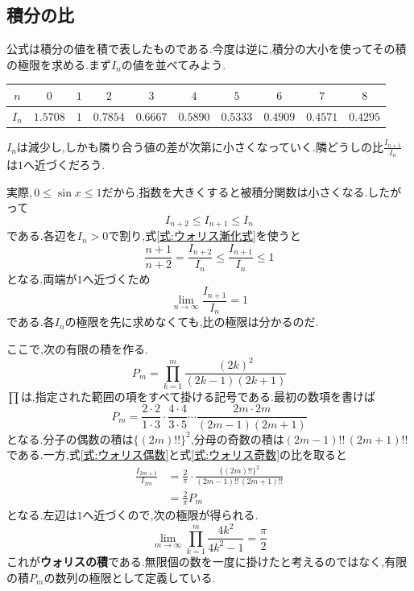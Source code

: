 \subsection{積分の比}

公式は積分の値を積で表したものである.今度は逆に,積分の大小を使ってその積の極限を求める.まず$I_n$の値を並べてみよう.
\begin{center}
\begin{tabular}{cccccccccc}
\toprule
$n$ & $0$ & $1$ & $2$ & $3$ & $4$ & $5$ & $6$ & $7$ & $8$\\
\midrule
$I_n$ & $1.5708$ & $1$ & $0.7854$ & $0.6667$ & $0.5890$ & $0.5333$ & $0.4909$ & $0.4571$ & $0.4295$\\
\bottomrule
\end{tabular}
\end{center}
$I_n$は減少し,しかも隣り合う値の差が次第に小さくなっていく.隣どうしの比$\frac{I_{n+1}}{I_n}$は$1$へ近づくだろう.

実際,\,$0\le\sin x\le1$だから,指数を大きくすると被積分関数は小さくなる.したがって
\[
 I_{n+2}\le I_{n+1}\le I_n
\]
である.各辺を$I_n>0$で割り,式\eqref{式:ウォリス漸化式}を使うと
\[
 \frac{n+1}{n+2}
 =\frac{I_{n+2}}{I_n}
 \le\frac{I_{n+1}}{I_n}\le1
\]
となる.両端が$1$へ近づくため
\begin{equation}\label{式:ウォリス隣接比}
 \lim_{n\to\infty}\frac{I_{n+1}}{I_n}=1
\end{equation}
である.各$I_n$の極限を先に求めなくても,比の極限は分かるのだ.

ここで,次の有限の積を作る.
\[
 P_m=\prod_{k=1}^{m}\frac{(2k)^2}{(2k-1)(2k+1)}
\]
$\prod$は,指定された範囲の項をすべて掛ける記号である.最初の数項を書けば
\[
 P_m=\frac{2\cdot2}{1\cdot3}\cdot
      \frac{4\cdot4}{3\cdot5}\cdots
      \frac{2m\cdot2m}{(2m-1)(2m+1)}
\]
となる.分子の偶数の積は$\{(2m)!!\}^2$,分母の奇数の積は$(2m-1)!!\,(2m+1)!!$である.一方,式\eqref{式:ウォリス偶数}と式\eqref{式:ウォリス奇数}の比を取ると
\begin{align*}
 \frac{I_{2m+1}}{I_{2m}}
 &=\frac{2}{\pi}\cdot
   \frac{\{(2m)!!\}^2}{(2m-1)!!\,(2m+1)!!}\\
 &=\frac{2}{\pi}P_m
\end{align*}
となる.左辺は$1$へ近づくので,次の極限が得られる.
\begin{equation}\label{式:ウォリスの積}
 \boxed{
 \lim_{m\to\infty}\prod_{k=1}^{m}
 \frac{4k^2}{4k^2-1}=\frac{\pi}{2}}
\end{equation}
これが\textbf{ウォリスの積}である.無限個の数を一度に掛けたと考えるのではなく,有限の積$P_m$の数列の極限として定義している.

